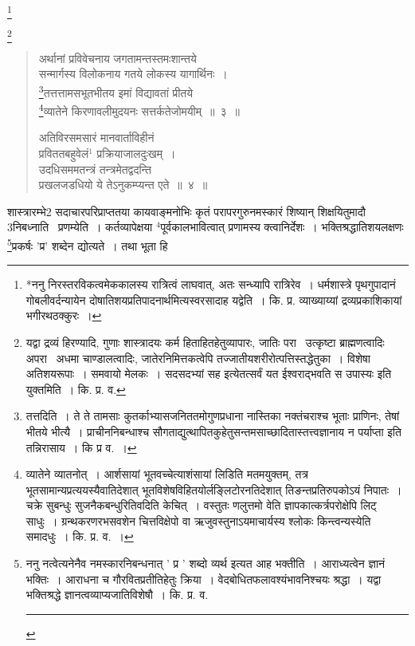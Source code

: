\documentclass[11pt, openany]{book}
\makeatletter
\newcommand{\devanagarinumeral}[1]{%
	\devanagaridigits{\number \csname c@#1\endcsname}} %
\newcommand\blfootnote[1]{%
 \begingroup
 \renewcommand\thefootnote{}\footnote{#1}%
 \addtocounter{footnote}{-1}%
 \endgroup
}
\makeatother
\begin{document}
\blfootnote{*ननु निरस्तरविकत्वमेककालस्य रात्रित्वं लाघवात्, अतः सन्ध्यापि रात्रिरेव~। धर्मशास्त्रे पृथगुपादानं गोबलीवर्दन्यायेन दोषातिशयप्रतिपादनार्थमित्यस्वरसादाह यद्वेति~। कि. प्र. व्याख्याय्यां द्रव्यप्रकाशिकायां भगीरथठक्कुरः~।}

\afterpage{\fancyhead[CE,CO]{\thepage}}
\cfoot{}
\newpage
\renewcommand{\thepage}{\devanagarinumeral{page}}
\setcounter{page}{2}

\blfootnote{यद्वा द्रव्यं हिरण्यादि, गुणाः शास्त्रादयः कर्म हिताहितहेतुव्यापारः, जातिः परा  \textendash\ उत्कृष्टा ब्राह्मणत्वादिः अपरा  \textendash\ अधमा चाण्डालत्वादिः, जातेरनिमित्तकत्वेपि तज्जातीयशरीरोत्पत्तिस्तद्धेतुका~। विशेषा अतिशयरूपाः~। समवायो मेलकः~। सदसदभ्यां सह इत्येतत्सर्वं यत ईश्वराद्भवति स उपास्यः इति युक्तमिति~। कि. प्र. व.}

\begin{quote}
{\knu अर्थानां प्रविवेचनाय जगतामन्तस्तमःशान्तये\\
सन्मार्गस्य विलोकनाय गतये लोकस्य यागार्थिनः~।\\
\renewcommand{\thefootnote}{१}\footnote{तत्तदिति~। ते ते तामसाः कुतर्काभ्यासजनिततमोगुणप्रधाना नास्तिका नक्तंचराश्च भूताः प्राणिनः, तेषां भीतये भीत्यै~। प्राचीननिबन्धाश्च सौगताद्युत्थापितकुहेतुसन्तमसाच्छादितास्तत्त्वज्ञानाय न पर्याप्ता इति तन्निरासाय~। कि प्र व.~।}तत्तत्तामसभूतभीतय इमां विद्यावतां प्रीतये\\
\renewcommand{\thefootnote}{२}\footnote{व्यातेने व्यातनोत्~। आर्शसायां भूतवच्चेत्याशंसायां लिडिति मतमयुक्तम्, तत्र भूतसामान्यप्रत्ययस्यैवातिदेशात् भूतविशेषविहितयोर्लङ्लिटोरनतिदेशात् तिङन्तप्रतिरुपकोऽयं निपातः~। चक्रे सुबन्धुः सुजनैकबन्धुरितिवदिति केचित्~। वस्तुतः णलुत्तमो वेति ज्ञापकात्कर्त्रपरोक्षेपि लिट् साधुः~। ग्रन्थकरणरभसवशेन चित्तविक्षेपो वा ऋजुवस्तुनाऽयमाचार्यस्य श्लोकः किन्त्वन्यस्येति समादधुः~। कि. प्र. व.~।}व्यातेने किरणावलीमुदयनः सत्तर्कतेजोमयीम्~॥~३~॥

अतिविरसमसारं मानवार्ताविहीनं\\
प्रविततबहुवेलं$^1$ प्रक्रियाजालदुःखम्~।\\
उदधिसममतन्त्रं तन्त्रमेतद्वदन्ति\\
प्रखलजडधियो ये तेऽनुकम्प्यन्त एते~॥~४~॥}
\end{quote}

शास्त्रारम्भे2 सदाचारपरिप्राप्ततया कायवाङ्मनोभिः कृतं परापरगुरुनमस्कारं शिष्यान् शिक्षयितुमादौ 3निबध्नाति \textendash\ {\knu प्रणम्ये}ति~। कर्तव्यापेक्षया ${}^4$पूर्वकालभावित्वात् प्रणामस्य क्त्वानिर्देशः~। भक्तिश्रद्धातिशयलक्षणः \renewcommand{\thefootnote}{३}\footnote{ननु नत्वेत्यनेनैव नमस्कारनिबन्धनात् ' प्र ' शब्दो व्यर्थ इत्यत आह भक्तीति~। आराध्यत्वेन ज्ञानं भक्तिः~। आराधना च गौरवितप्रतीतिहेतुः क्रिया~। वेदबोधितफलावश्यंभावनिश्चयः श्रद्धा~। यद्वा भक्तिश्रद्धे ज्ञानत्वव्याप्यजातिविशेषौ~। कि. प्र. व. \rule{0.4\linewidth}{0.5pt}}प्रकर्षः 'प्र' शब्देन द्योत्यते~। तथा भूता हि
\end{document}
